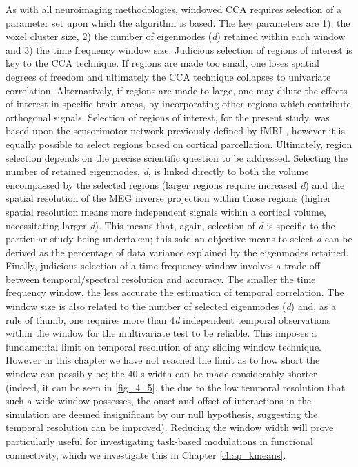 As with all neuroimaging methodologies, windowed CCA requires selection of a parameter set upon which the algorithm is based. The key parameters are 1); the voxel cluster size, 2) the number of eigenmodes (\textit{d}) retained within each window and 3) the time frequency window size. Judicious selection of regions of interest is key to the CCA technique. If regions are made too small, one loses spatial degrees of freedom and ultimately the CCA technique collapses to univariate correlation. Alternatively, if regions are made to large, one may dilute the effects of interest in specific brain areas, by incorporating other regions which contribute orthogonal signals. Selection of regions of interest, for the present study, was based upon the sensorimotor network previously defined by fMRI \citep{Smith2012}, however it is equally possible to select regions based on cortical parcellation. Ultimately, region selection depends on the precise scientific question to be addressed. Selecting the number of retained eigenmodes, \textit{d}, is linked directly to both the volume encompassed by the selected regions (larger regions require increased \textit{d}) and the spatial resolution of the MEG inverse projection within those regions (higher spatial resolution means more independent signals within a cortical volume, necessitating larger \textit{d}). This means that, again, selection of \textit{d} is specific to the particular study being undertaken; this said an objective means to select \textit{d} can be derived as the percentage of data variance explained by the eigenmodes retained. Finally, judicious selection of a time frequency window involves a trade-off between temporal/spectral resolution and accuracy. The smaller the time frequency window, the less accurate the estimation of temporal correlation. The window size is also related to the number of selected eigenmodes (\textit{d}) and, as a rule of thumb, one requires more than 4\textit{d} independent temporal observations within the window for the multivariate test to be reliable. This imposes a fundamental limit on temporal resolution of any sliding window technique. However in this chapter we have not reached the limit as to how short the window can possibly be; the 40 s width can be made considerably shorter (indeed, it can be seen in \ref{fig_4_5}, the due to the low temporal resolution that such a wide window possesses, the onset and offset of interactions in the simulation are deemed insignificant by our null hypothesis, suggesting the temporal resolution can be improved). Reducing the window width will prove particularly useful for investigating task-based modulations in functional connectivity, which we investigate this in Chapter \ref{chap_kmeans}. 

